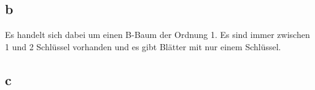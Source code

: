 \documentclass[12pt]{article}
\begin{document}
\begin{figure}[h]
		\centering
	\subfigure[overflow]{\scalebox{.35}{}}
\end{figure}

\begin{figure}[h]
		\centering
	\subfigure[fertig]{\scalebox{.35}{}}
\end{figure}


\newpage

\subsection*{b}
Es handelt sich dabei um einen B-Baum der Ordnung 1. Es sind immer zwischen 1 und 2 Schlüssel vorhanden und es gibt Blätter mit nur einem Schlüssel.
\subsection*{c}

\begin{figure}[h]
	\subfigure[Anfang]{\scalebox{.35}{}}
	\hspace{1cm}
	\centering
\end{figure}
	
\begin{figure}[ht]
	\hspace{1cm}
	\centering
\end{figure}


\begin{figure}[ht]
	\hspace{1cm}
	\centering
	\subfigure[Merge]{\scalebox{.35}{}}
\end{figure}

\newpage

	
\begin{figure}[ht]
	\hspace{1cm}
	\centering
	\subfigure[Merge]{\scalebox{.35}{}}
\end{figure}

\begin{figure}[ht]
	\centering
\end{figure}
\end{document}
